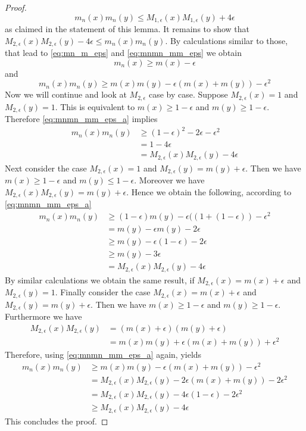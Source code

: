 \begin{lemma}
\begin{proof}
		$$m_n(x)m_n(y) \leq M_{1,\epsilon}(x)M_{1,\epsilon}(y) + 4\epsilon$$
		as claimed in the statement of this lemma. It remains to show that $M_{2,\epsilon}(x)M_{2,\epsilon}(y) - 4\epsilon \leq m_n(x)m_n(y)$. By calculations similar to those, that lead to \eqref{eq:mn_m_eps} and \eqref{eq:mnmn_mm_eps} we obtain
		$$m_n(x) \geq m(x) - \epsilon$$
		and
		\begin{equation}
		m_n(x)m_n(y) \geq m(x)m(y) - \epsilon(m(x) + m(y)) - \epsilon^2 \label{eq:mnmn_mm_eps_a}
		\end{equation}
		Now we will continue and look at $M_{2,\epsilon}$ case by case. Suppose $M_{2,\epsilon}(x) = 1$ and $M_{2,\epsilon}(y) = 1$. This is equivalent to $m(x) \geq 1 - \epsilon$ and $m(y) \geq 1 - \epsilon$. Therefore \eqref{eq:mnmn_mm_eps_a} implies 
		\begin{align*}
			m_n(x)m_n(y) &\geq (1-\epsilon)^2 - 2\epsilon - \epsilon^2\\
			&= 1 - 4\epsilon\\
			&= M_{2,\epsilon}(x)M_{2,\epsilon}(y) - 4\epsilon
		\end{align*}
		Next consider the case $M_{2,\epsilon}(x) = 1$ and $M_{2,\epsilon}(y) = m(y) + \epsilon$. Then we have $m(x) \geq 1-\epsilon$ and  $m(y) \leq 1-\epsilon$. Moreover we have $M_{2,\epsilon}(x)M_{2,\epsilon}(y) = m(y) + \epsilon$. Hence we obtain the following, according to \eqref{eq:mnmn_mm_eps_a}
		\begin{align*}
			m_n(x)m_n(y) &\geq (1-\epsilon)m(y) - \epsilon((1 + (1-\epsilon)) - \epsilon^2\\
			&= m(y)-\epsilon m(y) - 2\epsilon\\
			&\geq m(y)-\epsilon (1-\epsilon) - 2\epsilon\\
			&\geq m(y)-3\epsilon \\
			&= M_{2,\epsilon}(x)M_{2,\epsilon}(y) - 4\epsilon
		\end{align*} 
		By similar calculations we obtain the same result, if $M_{2,\epsilon}(x) = m(x) + \epsilon$ and $M_{2,\epsilon}(y) = 1$. Finally consider the case $M_{2,\epsilon}(x) = m(x) + \epsilon$ and $M_{2,\epsilon}(y) = m(y) + \epsilon$. Then we have $m(x) \geq 1-\epsilon$ and $m(y) \geq 1-\epsilon$. Furthermore we have 
		\begin{align*}
			M_{2,\epsilon}(x)M_{2,\epsilon}(y) &= (m(x) +\epsilon)(m(y) + \epsilon)\\
			&= m(x)m(y) + \epsilon(m(x) + m(y)) + \epsilon^2
		\end{align*}
		Therefore, using \eqref{eq:mnmn_mm_eps_a} again, yields
		\begin{align*}
			m_n(x)m_n(y) &\geq m(x)m(y) - \epsilon(m(x) + m(y)) - \epsilon^2\\
			&= M_{2,\epsilon}(x) M_{2,\epsilon}(y) - 2\epsilon(m(x) + m(y)) - 2\epsilon^2\\
			&= M_{2,\epsilon}(x) M_{2,\epsilon}(y) - 4\epsilon(1-\epsilon) - 2\epsilon^2\\
			&\geq M_{2,\epsilon}(x) M_{2,\epsilon}(y) - 4\epsilon 
		\end{align*}
		This concludes the proof.
	\end{proof}
\end{lemma}

